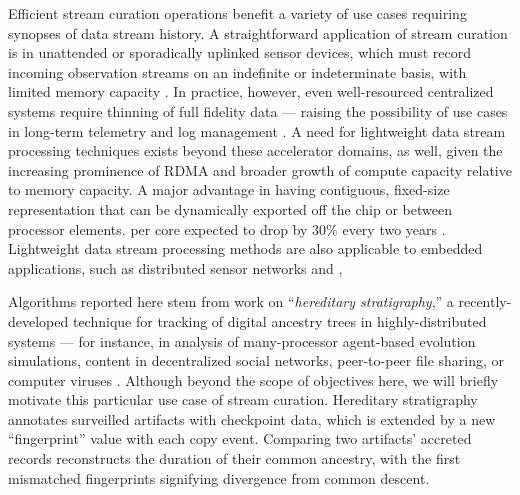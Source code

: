 Efficient stream curation operations benefit a variety of use cases requiring synopses of data stream history.
A straightforward application of stream curation is in unattended or sporadically uplinked sensor devices, which must record incoming observation streams on an indefinite or indeterminate basis, with limited memory capacity \citep{jain2022survey}.
In practice, however, even well-resourced centralized systems require thinning of full fidelity data --- raising the possibility of use cases in long-term telemetry and log management \citep{kent2006guide,miebach2002hubble}.
A need for lightweight data stream processing techniques exists beyond these accelerator domains, as well, given the increasing prominence of RDMA \citep{wang2024survey} and broader growth of compute capacity relative to memory capacity.
A major advantage in having contiguous, fixed-size representation that can be dynamically exported off the chip or between processor elements.
per core expected to drop by 30\% every two years \citep{qureshi2014memory}.
Lightweight data stream processing methods are also applicable to embedded applications, such as distributed sensor networks and \citep{elnahrawy2003research},


Algorithms reported here stem from work on ``\textit{hereditary stratigraphy},'' a recently-developed technique for tracking of digital ancestry trees in highly-distributed systems --- for instance, in analysis of many-processor agent-based evolution simulations, content in decentralized social networks, peer-to-peer file sharing, or computer viruses \citep{moreno2022hereditary}.
Although beyond the scope of objectives here, we will briefly motivate this particular use case of stream curation.
Hereditary stratigraphy annotates surveilled artifacts with checkpoint data, which is extended by a new ``fingerprint'' value with each copy event.
Comparing two artifacts' accreted records reconstructs the duration of their common ancestry, with the first mismatched fingerprints signifying divergence from common descent.

